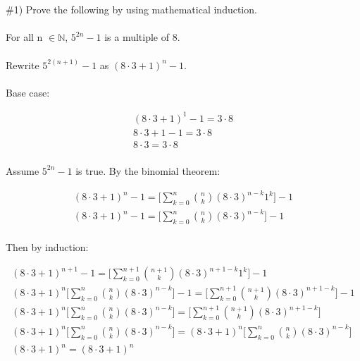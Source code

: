 \documentclass[11pt]{article}
\begin{document}

\section{}

\#1) Prove the following by using mathematical induction.

\paragraph{}

For all n $\in \mathbb{N}$, $5^{2n}-1$ is a multiple of 8.

\paragraph{}

Rewrite $5^{2(n+1)}-1$ as $(8\cdot3 + 1)^n-1$.
\paragraph{}
Base case:

\begin{equation}
	\begin{aligned}
		(8\cdot3+1)^1-1=3\cdot8 \\
		8\cdot3+1-1=3\cdot8 \\
		8\cdot3=3\cdot8 \\
	\end{aligned}
\end{equation}

Assume $5^{2n}-1$ is true.  By the binomial theorem:

\begin{equation}
	\begin{aligned}
		(8\cdot3+1)^n-1=\bigg[\sum_{k=0}^{n} \binom{n}{k}(8\cdot3)^{n-k}1^k\bigg] - 1 \\
		(8\cdot3+1)^n-1=\bigg[\sum_{k=0}^{n} \binom{n}{k}(8\cdot3)^{n-k}\bigg] - 1 \\
	\end{aligned}
\end{equation}

Then by induction:

\begin{equation}
	\begin{gathered}
		(8\cdot3+1)^{n+1}-1=\bigg[\sum_{k=0}^{n+1} \binom{n+1}{k}(8\cdot3)^{n+1-k}1^k\bigg] - 1 \\
		(8\cdot3+1)^{n}\bigg[\sum_{k=0}^{n} \binom{n}{k}(8\cdot3)^{n-k}\bigg] - 1 =\bigg[\sum_{k=0}^{n+1} \binom{n+1}{k}(8\cdot3)^{n+1-k}\bigg] - 1 \\
		(8\cdot3+1)^{n}\bigg[\sum_{k=0}^{n} \binom{n}{k}(8\cdot3)^{n-k}\bigg] =\bigg[\sum_{k=0}^{n+1} \binom{n+1}{k}(8\cdot3)^{n+1-k}\bigg] \\
		(8\cdot3+1)^{n}\bigg[\sum_{k=0}^{n} \binom{n}{k}(8\cdot3)^{n-k}\bigg] =(8\cdot3+1)^{n}\bigg[\sum_{k=0}^{n} \binom{n}{k}(8\cdot3)^{n-k}\bigg] \\
		(8\cdot3+1)^{n} =(8\cdot3+1)^{n} \\
	\end{gathered}
\end{equation}
\end{document}
